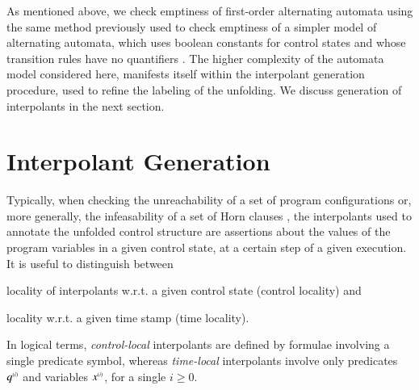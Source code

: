 \documentclass{llncs}
\begin{document}
As mentioned above, we check emptiness of first-order alternating
automata using the same method previously used to check emptiness of a
simpler model of alternating automata, which uses boolean constants
for control states and whose transition rules have no quantifiers
\cite{IosifXu18}. The higher complexity of the automata model
considered here, manifests itself within the interpolant generation
procedure, used to refine the labeling of the unfolding. We discuss
generation of interpolants in the next section.

\section{Interpolant Generation}\label{sec:interpolants}

Typically, when checking the unreachability of a set of program
configurations or, more generally, the infeasability of a set of Horn
clauses \cite{BjornerGurfinkelMcMillanRybalchenko15}, the interpolants
used to annotate the unfolded control structure are assertions about
the values of the program variables in a given control state, at a
certain step of a given execution. It is useful to distinguish between
\begin{inparaenum}[(i)]
\item locality of interpolants w.r.t. a given control state (control
  locality) and
%
\item locality w.r.t. a given time stamp (time locality).
\end{inparaenum} 
In logical terms, \emph{control-local} interpolants are defined by
formulae involving a single predicate symbol, whereas
\emph{time-local} interpolants involve only predicates ${q}^{\scriptscriptstyle{({i})}}$
and variables ${x}^{\scriptscriptstyle{({i})}}$, for a single $i \geq 0$.
\end{document}
